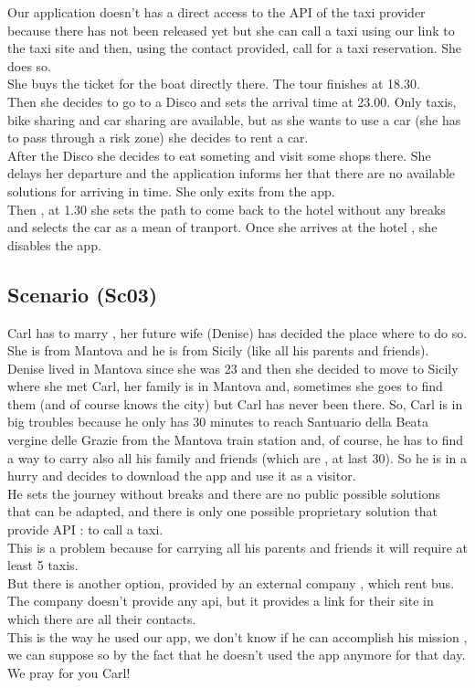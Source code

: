 \documentclass[a4paper,leqno]{book}
\begin{document}
Our application doesn't has a direct access to the API of the taxi provider because there has not been released yet but she can call a taxi using our link to the taxi site and then, using the contact provided, call for a taxi reservation. She does so.\\
She buys the ticket for the boat directly there. 
The tour finishes at 18.30.\\
Then she decides to go to a Disco and sets the arrival time at 23.00.
Only taxis, bike sharing and car sharing are available, but as she wants to use a car (she has to pass through a risk zone) she decides to rent a car.\\
After the Disco she decides to eat someting and visit some shops there. 
She delays her departure and the application informs her that there are no available solutions for arriving in time. She only exits from the app.\\
Then , at 1.30 she sets the path to come back to the hotel without any breaks and selects the car as a mean of tranport. Once she arrives at the hotel , she disables the app.\\

\subsection{Scenario (Sc03) }
Carl has to marry , her future wife (Denise) has decided the place where to do so.\\
She is from Mantova and he is from Sicily (like all his parents and friends).\\
Denise lived in Mantova since she was 23 and then she decided to move to Sicily where she met Carl, her family is in Mantova and, sometimes she goes to find them (and of course knows the city) but Carl has never been there.
So, Carl is in big troubles because he only has 30 minutes to reach Santuario della Beata vergine delle Grazie from the Mantova train station and, of course, he has to find a way to carry also all his family and friends (which are , at last 30).
So he is in a hurry and decides to download the app and use it as a visitor.\\
He sets the journey without breaks and there are no public possible solutions that can be adapted, and there is only one possible proprietary solution that provide API : to call a taxi.\\
This is a problem because for carrying all his parents and friends it will require at least 5 taxis.\\
But there is another option, provided by an external company , which rent bus.\\
The company doesn't provide any api, but it provides a link for their site in which there are all their contacts.\\
This is the way he used our app, we don't know if he can accomplish his mission , we can suppose so by the fact that he doesn't used the app anymore for that day.\\
We pray for you Carl!\\
\end{document}
